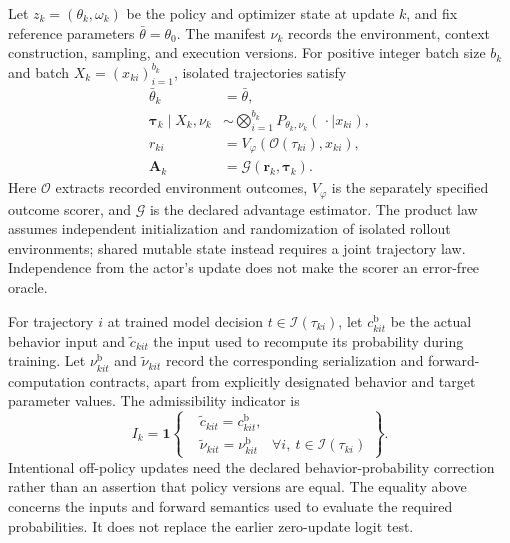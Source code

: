 Let $z_k=(\theta_k,\omega_k)$ be the policy and optimizer state at update $k$, and fix reference parameters $\bar\theta=\theta_0$. The manifest $\nu_k$ records the environment, context construction, sampling, and execution versions. For positive integer batch size $b_k$ and batch $X_k=(x_{ki})_{i=1}^{b_k}$, isolated trajectories satisfy
\begin{equation}
\label{eq:C08:mathematical-rollout}
\begin{aligned}
 \bar\theta_k&=\bar\theta,\\
 \boldsymbol\tau_k\mid X_k,\nu_k
 &\sim\bigotimes_{i=1}^{b_k}
       P_{\theta_k,\nu_k}(\,\cdot\mid x_{ki}),\\
 r_{ki}&=V_\varphi\!\left(\mathcal O(\tau_{ki}),x_{ki}\right),\\
 \boldsymbol A_k&=\mathcal G(\boldsymbol r_k,\boldsymbol\tau_k).
\end{aligned}
\end{equation}
Here $\mathcal O$ extracts recorded environment outcomes, $V_\varphi$ is the separately specified outcome scorer, and $\mathcal G$ is the declared advantage estimator. The product law assumes independent initialization and randomization of isolated rollout environments; shared mutable state instead requires a joint trajectory law. Independence from the actor's update does not make the scorer an error-free oracle.

For trajectory $i$ at trained model decision $t\in\mathcal I(\tau_{ki})$, let $c^{\mathrm b}_{kit}$ be the actual behavior input and $\widetilde c_{kit}$ the input used to recompute its probability during training. Let $\nu^{\mathrm b}_{kit}$ and $\widetilde\nu_{kit}$ record the corresponding serialization and forward-computation contracts, apart from explicitly designated behavior and target parameter values. The admissibility indicator is
\begin{equation}
\label{eq:C08:conditioning-gate}
 I_k=\mathbf1\!\left\{
 \begin{aligned}
 &\widetilde c_{kit}=c^{\mathrm b}_{kit},\\
 &\widetilde\nu_{kit}=\nu^{\mathrm b}_{kit}
 \quad\forall i,\ t\in\mathcal I(\tau_{ki})
 \end{aligned}\right\}.
\end{equation}
Intentional off-policy updates need the declared behavior-probability correction rather than an assertion that policy versions are equal. The equality above concerns the inputs and forward semantics used to evaluate the required probabilities. It does not replace the earlier zero-update logit test.

